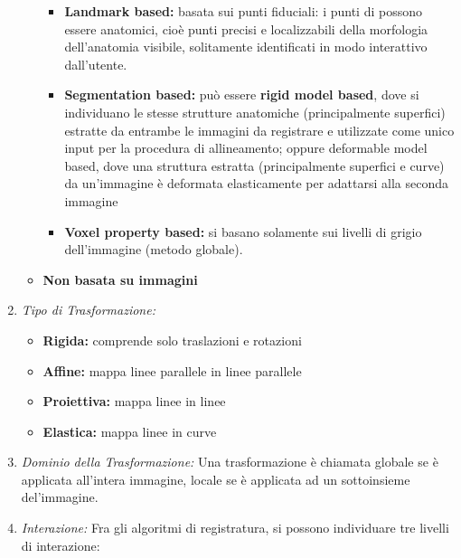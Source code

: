 \begin{enumerate}
\begin{itemize}
                    \begin{itemize}
                        \item \textbf{Landmark based:} basata sui punti fiduciali: i punti di possono essere anatomici, cioè punti precisi e
                              localizzabili della morfologia dell'anatomia visibile, solitamente identificati in modo interattivo dall'utente.
                        \item \textbf{Segmentation based:} può essere \textbf{rigid model based}, dove si
                              individuano le stesse strutture anatomiche (principalmente superfici) estratte da entrambe le immagini da registrare e
                              utilizzate come unico input per la procedura di allineamento; oppure deformable model based, dove una struttura estratta
                              (principalmente superfici e curve) da un'immagine è deformata elasticamente per adattarsi alla seconda immagine
                        \item  \textbf{Voxel property based:} si basano solamente sui livelli di grigio
                              dell'immagine (metodo globale).
                    \end{itemize}
              \item \textbf{Non basata su immagini}
          \end{itemize}
    \item \textit{Tipo di Trasformazione:}
          \begin{itemize}
              \item \textbf{Rigida:} comprende solo traslazioni e rotazioni
              \item \textbf{Affine:} mappa linee parallele in linee parallele
              \item \textbf{Proiettiva:} mappa linee in linee
              \item \textbf{Elastica:} mappa linee in curve
          \end{itemize}
    \item \textit{Dominio della Trasformazione:}
          Una trasformazione è chiamata globale se è applicata all'intera immagine, locale se è applicata ad un sottoinsieme del'immagine.
    \item \textit{Interazione:}
          Fra gli algoritmi di registratura, si possono individuare tre livelli di interazione:


\end{enumerate}
